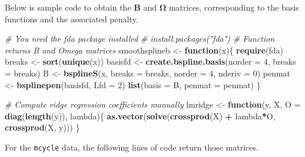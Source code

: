 \documentclass[]{book}
\newenvironment{Shaded}{\begin{snugshade}}{\end{snugshade}}
\newcommand{\CommentTok}[1]{\textcolor[rgb]{0.56,0.35,0.01}{\textit{#1}}}
\newcommand{\ControlFlowTok}[1]{\textcolor[rgb]{0.13,0.29,0.53}{\textbf{#1}}}
\newcommand{\DataTypeTok}[1]{\textcolor[rgb]{0.13,0.29,0.53}{#1}}
\newcommand{\DecValTok}[1]{\textcolor[rgb]{0.00,0.00,0.81}{#1}}
\newcommand{\KeywordTok}[1]{\textcolor[rgb]{0.13,0.29,0.53}{\textbf{#1}}}
\newcommand{\NormalTok}[1]{#1}
\newcommand{\OperatorTok}[1]{\textcolor[rgb]{0.81,0.36,0.00}{\textbf{#1}}}
\newcommand{\StringTok}[1]{\textcolor[rgb]{0.31,0.60,0.02}{#1}}
\theoremstyle{definition}
\theoremstyle{definition}
\theoremstyle{definition}
\theoremstyle{remark}
\begin{document}
Below is sample code to obtain the \(\mathbf{B}\) and \(\boldsymbol{\Omega}\) matrices, corresponding to the basis functions and the associated penalty.

\begin{Shaded}
\begin{Highlighting}[]
\CommentTok{# You need the fda package installed}
\CommentTok{# install.packages("fda")}
\CommentTok{# Function returns B and Omega matrices}
\NormalTok{smoothsplineb <-}\StringTok{ }\ControlFlowTok{function}\NormalTok{(x)\{}
  \KeywordTok{require}\NormalTok{(fda)}
\NormalTok{  breaks <-}\StringTok{ }\KeywordTok{sort}\NormalTok{(}\KeywordTok{unique}\NormalTok{(x))}
\NormalTok{  basisfd <-}\StringTok{ }\KeywordTok{create.bspline.basis}\NormalTok{(}\DataTypeTok{norder =} \DecValTok{4}\NormalTok{, }\DataTypeTok{breaks =}\NormalTok{ breaks)}
\NormalTok{  B <-}\StringTok{ }\KeywordTok{bsplineS}\NormalTok{(x, }\DataTypeTok{breaks =}\NormalTok{ breaks, }\DataTypeTok{norder =} \DecValTok{4}\NormalTok{, }\DataTypeTok{nderiv =} \DecValTok{0}\NormalTok{)}
\NormalTok{  penmat <-}\StringTok{ }\KeywordTok{bsplinepen}\NormalTok{(basisfd, }\DataTypeTok{Lfd =} \DecValTok{2}\NormalTok{)}
  \KeywordTok{list}\NormalTok{(}\DataTypeTok{basis =}\NormalTok{ B, }\DataTypeTok{penmat =}\NormalTok{ penmat)}
\NormalTok{\}}

\CommentTok{# Compute ridge regression coefficients manually}
\NormalTok{lmridge <-}\StringTok{ }\ControlFlowTok{function}\NormalTok{(y, X, }\DataTypeTok{O =} \KeywordTok{diag}\NormalTok{(}\KeywordTok{length}\NormalTok{(y)), lambda)\{ }
  \KeywordTok{as.vector}\NormalTok{(}\KeywordTok{solve}\NormalTok{(}\KeywordTok{crossprod}\NormalTok{(X) }\OperatorTok{+}\StringTok{ }\NormalTok{lambda}\OperatorTok{*}\NormalTok{O, }\KeywordTok{crossprod}\NormalTok{(X, y)))}
\NormalTok{\}}
\end{Highlighting}
\end{Shaded}

For the \texttt{mcycle} data, the following lines of code return those matrices.

\begin{Shaded}
\end{Shaded}
\end{document}
